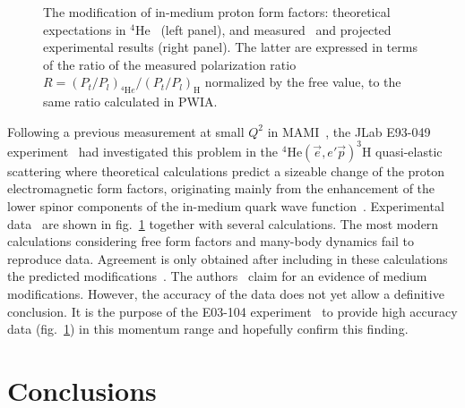 \documentclass{elsart}
\begin{document}
\vspace*{10pt}
\begin{figure}[ht]

\vspace*{5pt}


\vspace*{-150pt}
 

\caption{The modification of in-medium proton form factors: theoretical
expectations in $^4$He~\cite{Lu99} (left panel), and measured~\cite{Str03} and 
projected~\cite{E03104} experimental results (right panel). The latter are 
expressed in terms of the ratio of the measured polarization ratio 
$R=(P_t/P_l)_{^4{\mathrm He}} \big/ (P_t/P_l)_{\mathrm H}$ normalized by the free 
value, to the same ratio calculated in PWIA.}
\label{bff}
\end{figure}
Following a previous measurement at small $Q^2$ in MAMI~\cite{Die01}, the JLab 
E93-049 experiment~\cite{E93049} had investigated this problem in the 
$^4$He$({\vec e},e'{\vec p})^3$H quasi-elastic scattering where theoretical
calculations predict a sizeable change of the proton electromagnetic form 
factors, originating mainly from the enhancement of the lower 
spinor components of the in-medium quark wave function~\cite{Lu99}. Experimental 
data~\cite{Str03} are shown in fig.~\ref{bff} together with several 
calculations. The most modern calculations considering 
free form factors and many-body dynamics fail to reproduce data. Agreement is 
only obtained after including in these calculations the predicted 
modifications~\cite{Lu99}. The authors~\cite{Str03} claim for an evidence of 
medium modifications. However, the accuracy of the data does not yet allow a 
definitive conclusion. It is the purpose of the E03-104 experiment~\cite{E03104} 
to provide high accuracy data (fig.~\ref{bff}) in this momentum range and 
hopefully confirm this finding.

%
%
\section{Conclusions}
\end{document}
